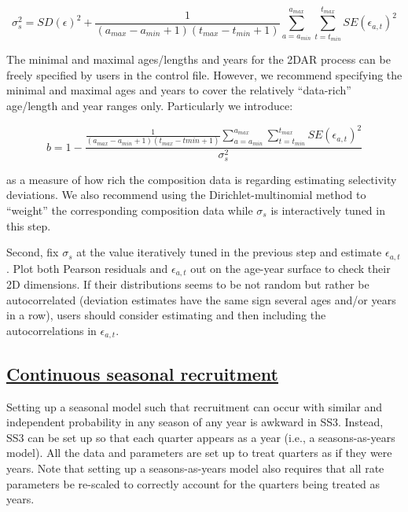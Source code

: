 \begin{equation}
\sigma_s^2=SD(\epsilon)^2+\frac{1}{(a_{max}-a_{min}+1)(t_{max}-t_{min}+1)}\sum_{a=a_{min}}^{a_{max}}\sum_{t=t_{min}}^{t_{max}}SE(\epsilon_{a,t})^2
\end{equation}

The minimal and maximal ages/lengths and years for the 2DAR process can be freely specified by users in the control file. However, we recommend specifying the minimal and maximal ages and years to cover the relatively ``data-rich'' age/length and year ranges only. Particularly we introduce: 

\begin{equation}
b=1-\frac{\frac{1}{(a_{max}-a_{min}+1)(t_{max}-t{min}+1)}\sum_{a=a_{min}}^{a_{max}}\sum_{t=t_{min}}^{t_{max}}SE(\epsilon_{a,t})^2}{\sigma_s^2}
\end{equation}

as a measure of how rich the composition data is regarding estimating selectivity deviations. We also recommend using the Dirichlet-multinomial method to ``weight'' the corresponding composition data while $\sigma_s$ is interactively tuned in this step.

Second, fix $\sigma_s$ at the value iteratively tuned in the previous step and estimate $\epsilon_{a,t}$. Plot both Pearson residuals and $\epsilon_{a,t}$ out on the age-year surface to check their 2D dimensions. If their distributions seems to be not random but rather be autocorrelated (deviation estimates have the same sign several ages and/or years in a row), users should consider estimating and then including the autocorrelations in $\epsilon_{a,t}$.


\hypertarget{continuous-seasonal-recruitment-sec}{}
\subsection[Continuous seasonal recruitment]{\protect\hyperlink{continuous-seasonal-recruitment-sec}{Continuous seasonal recruitment}}
Setting up a seasonal model such that recruitment can occur with similar and independent probability in any season of any year is awkward in SS3. Instead, SS3 can be set up so that each quarter appears as a year (i.e., a seasons-as-years model). All the data and parameters are set up to treat quarters as if they were years. Note that setting up a seasons-as-years model also requires that all rate parameters be re-scaled to correctly account for the quarters being treated as years.

